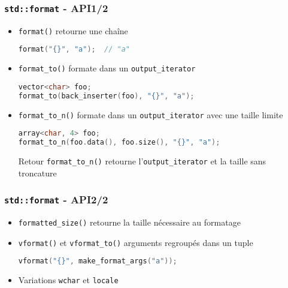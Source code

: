 \documentclass[C++.tex]{subfiles}
\begin{document}
\begin{frame}[fragile]
	\frametitle{\lstinline|std::format| - API\titlehfill{}1/2}
	\begin{itemize}
		\item \lstinline|format()| retourne une chaîne

		\begin{lstlisting}[language=C++]
format("{}", "a"); 	// "a"\end{lstlisting}

		\item \lstinline|format_to()| formate dans un \lstinline|output_iterator|

		\begin{lstlisting}[language=C++]
vector<char> foo;
format_to(back_inserter(foo), "{}", "a");\end{lstlisting}


		\item \lstinline|format_to_n()| formate dans un \lstinline|output_iterator| avec une taille limite

		\begin{lstlisting}[language=C++]
array<char, 4> foo;
format_to_n(foo.data(), foo.size(), "{}", "a");\end{lstlisting}


		\begin{block}{Retour}
			\lstinline|format_to_n()| retourne l'\lstinline|output_iterator| et la taille sans troncature
		\end{block}
	\end{itemize}
\end{frame}


\begin{frame}[fragile]
	\frametitle{\lstinline|std::format| - API\titlehfill{}2/2}
	\begin{itemize}
		\item \lstinline|formatted_size()| retourne la taille nécessaire au formatage
		\item \lstinline|vformat()| et \lstinline|vformat_to()| arguments regroupés dans un \og tuple\fg{}

		\begin{lstlisting}[language=C++]
vformat("{}", make_format_args("a"));\end{lstlisting}

		\item Variations \lstinline|wchar| et \lstinline|locale|
	\end{itemize}
\end{frame}
\end{document}
